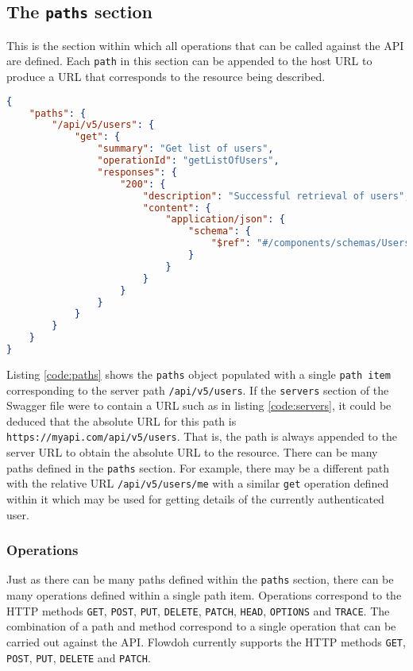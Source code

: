 \subsection{The \texttt{paths} section}
This is the section within which all operations that can be called against the API are defined. Each \texttt{path} in this section can be appended to the host URL to produce a URL that corresponds to the resource being described.
\begin{lstlisting}[caption={The \texttt{paths} object},label={code:paths},language=json]
{
    "paths": {
        "/api/v5/users": {
            "get": {
                "summary": "Get list of users",
                "operationId": "getListOfUsers",
                "responses": {
                    "200": {
                        "description": "Successful retrieval of users",
                        "content": {
                            "application/json": {
                                "schema": {
                                    "$ref": "#/components/schemas/UsersList"
                                }
                            }
                        }
                    }
                }
            }
        }
    }
}
\end{lstlisting}
Listing \ref{code:paths} shows the \texttt{paths} object populated with a single \texttt{path item} corresponding to the server path \texttt{/api/v5/users}. If the \texttt{servers} section of the Swagger file were to contain a URL such as in listing \ref{code:servers}, it could be deduced that the absolute URL for this path is \texttt{https://myapi.com/api/v5/users}. That is, the path is always appended to the server URL to obtain the absolute URL to the resource. There can be many paths defined in the \texttt{paths} section. For example, there may be a different path with the relative URL \texttt{/api/v5/users/me} with a similar \texttt{get} operation defined within it which may be used for getting details of the currently authenticated user.
\subsubsection{Operations}
\label{subsubsec:operations}
Just as there can be many paths defined within the \texttt{paths} section, there can be many operations defined within a single path item. Operations correspond to the HTTP methods \texttt{GET}, \texttt{POST}, \texttt{PUT}, \texttt{DELETE}, \texttt{PATCH}, \texttt{HEAD}, \texttt{OPTIONS} and \texttt{TRACE}. The combination of a path and method correspond to a single operation that can be carried out against the API. Flowdoh currently supports the HTTP methods \texttt{GET}, \texttt{POST}, \texttt{PUT}, \texttt{DELETE} and \texttt{PATCH}.

